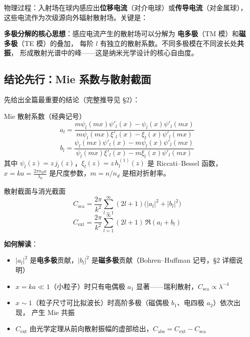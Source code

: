 物理过程：入射场在球内感应出\textbf{位移电流}（对介电球）或\textbf{传导电流}（对金属球），
这些电流作为次级源向外辐射散射场。关键是：

\begin{nontrivial}
\textbf{多极分解的核心思想}：感应电流产生的散射场可以分解为
\textbf{电多极}（TM 模）和\textbf{磁多极}（TE 模）的叠加，
每阶 $l$ 有独立的散射系数。不同多极模在不同波长处\textbf{共振}，
形成散射光谱中的峰——这是纳米光学设计的核心自由度。
\end{nontrivial}

\subsection{结论先行：Mie 系数与散射截面}

先给出全篇最重要的结论（完整推导见 \S2）：

\begin{stepbox}{Mie 散射系数（经典记号）}
\begin{equation}
  \boxed{\;
  a_l = \frac{m\psi_l(mx)\psi'_l(x) - \psi_l(x)\psi'_l(mx)}
            {m\psi_l(mx)\xi'_l(x) - \xi_l(x)\psi'_l(mx)}
  \;}
  \label{eq:mot_al}
\end{equation}
\begin{equation}
  \boxed{\;
  b_l = \frac{\psi_l(mx)\psi'_l(x) - m\psi_l(x)\psi'_l(mx)}
            {\psi_l(mx)\xi'_l(x) - m\xi_l(x)\psi'_l(mx)}
  \;}
  \label{eq:mot_bl}
\end{equation}
其中 $\psi_l(z)=z\,j_l(z)$，$\xi_l(z)=z\,h_l^{(1)}(z)$ 是 Riccati--Bessel 函数，
$x=ka=\frac{2\pi n_d a}{\lambda_0}$ 是尺度参数，$m=n/n_d$ 是相对折射率。
\end{stepbox}

\begin{stepbox}{散射截面与消光截面}
\begin{equation}
  C_{\text{sca}} = \frac{2\pi}{k^2}\sum_{l=1}^\infty(2l+1)\bigl(|a_l|^2+|b_l|^2\bigr)
  \label{eq:mot_Csca}
\end{equation}
\begin{equation}
  C_{\text{ext}} = \frac{2\pi}{k^2}\sum_{l=1}^\infty(2l+1)\,\Re(a_l+b_l)
  \label{eq:mot_Cext}
\end{equation}
\end{stepbox}

\begin{noteworthy}
\textbf{如何解读}：
\begin{itemize}
  \item $|a_l|^2$ 是\textbf{电多极}贡献，$|b_l|^2$ 是\textbf{磁多极}贡献（Bohren--Huffman 记号，\S2 详细说明）
  \item $x=ka\ll1$（小粒子）时只有电偶极 $a_1$ 显著——瑞利散射，$C_{\text{sca}}\propto\lambda^{-4}$
  \item $x\sim1$（粒子尺寸可比拟波长）时高阶多极（磁偶极 $b_1$、电四极 $a_2$）依次出现，
    产生 Mie 共振
  \item $C_{\text{ext}}$ 由光学定理从前向散射振幅的虚部给出，$C_{\text{abs}}=C_{\text{ext}}-C_{\text{sca}}$
\end{itemize}
\end{noteworthy}

